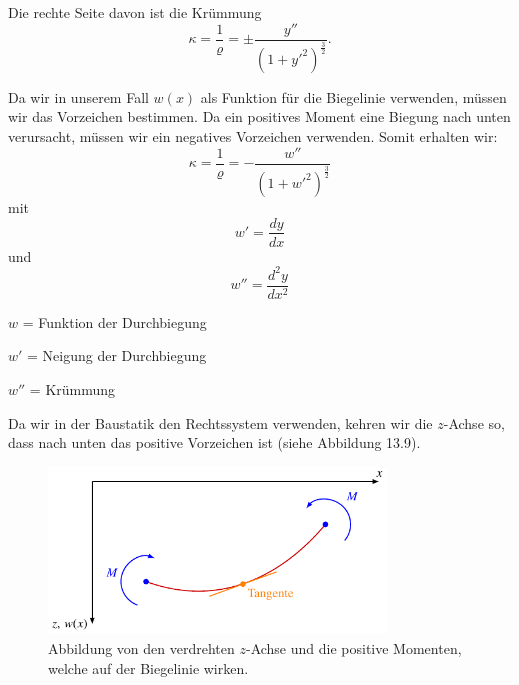 Die rechte Seite davon ist die Krümmung
\begin{equation}
	\kappa = \frac{1}{\varrho} = \pm \frac{y''}{(1 + {y'}^2)^{\frac{3}{2}}}.
\end{equation}

Da wir in unserem Fall $w(x)$ als Funktion für die Biegelinie verwenden, müssen wir das Vorzeichen bestimmen. Da ein positives Moment eine Biegung nach unten verursacht, müssen wir ein negatives Vorzeichen verwenden. Somit erhalten wir:
\begin{equation}
	\kappa=
	\frac{1}{\varrho}=
	-\frac{w''}{\left(1+{w'}^2\right)^\frac{3}{2}}
\end{equation}
mit
\begin{equation}
	w'=
	\frac{dy}{dx} 
\end{equation}
und
\begin{equation}
	w''=
	\frac{d^2y}{dx^2}
\end{equation}

$w$ = Funktion der Durchbiegung

$w'$ = Neigung der Durchbiegung

$w''$ = Krümmung

Da wir in der Baustatik den Rechtssystem verwenden, kehren wir die $z$-Achse so, dass nach unten das positive Vorzeichen ist (siehe Abbildung 13.9).
\begin{figure}
\centering
	\includegraphics[width=0.8\textwidth]{papers/balken/images/teil2/BiegungverdrehteAchsen.pdf}
\caption{Abbildung von den verdrehten $z$-Achse und die positive Momenten, welche auf der Biegelinie wirken.}
\label{fig:Abbildung von den verdrehten $z$-Achse und die positive Momenten, welche auf der Biegelinie wirken.}
\end{figure}

